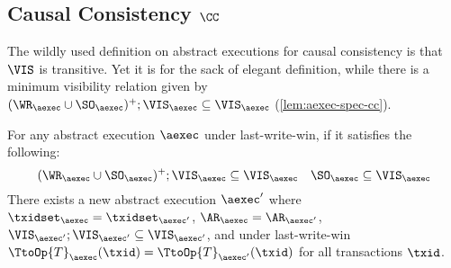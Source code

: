 \subsection{Causal Consistency \( \CC \)}
\label{sec:sound-complete-cc}

The wildly used definition on abstract executions for causal consistency is that \( \VIS \) is transitive.
Yet it is for the sack of elegant definition, while there is a minimum visibility relation given by \( (\WR_\aexec \cup \SO_\aexec)^{+} ; \VIS_\aexec \subseteq \VIS_\aexec \) (\cref{lem:aexec-spec-cc}).

\begin{lemma}
    \label{lem:aexec-spec-cc}
    For any abstract execution \( \aexec \) under last-write-win, if it satisfies the following:
    \[
        (\WR_\aexec \cup \SO_\aexec)^{+} ; \VIS_\aexec \subseteq \VIS_\aexec \quad \SO_\aexec \subseteq \VIS_\aexec
    \]
    There exists a new abstract execution \( \aexec' \) where \( \txidset_\aexec = \txidset_{\aexec'} \), \( \AR_\aexec = \AR_{\aexec'} \),
    \( \VIS_{\aexec'} ; \VIS_{\aexec'} \subseteq \VIS_{\aexec'} \), and
    under last-write-win \( \TtoOp{T}_{\aexec}(\txid) = \TtoOp{T}_{\aexec'}(\txid) \) for all transactions \( \txid \).
\end{lemma}
